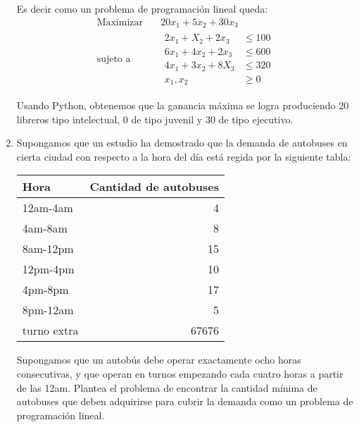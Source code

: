 \documentclass[twocolumn]{article}
\begin{document}
\begin{enumerate}
Es decir como un problema de programación lineal queda:
\begin{equation*}
 \begin{aligned}
\text{Maximizar} \quad & 20x_{1}+5x_{2}+30x_{3}\\
\text{sujeto a} \quad &
  \begin{aligned}
   2x_{1}+X_2+2x_3 &\leq 100\\
   6x_1 +4x_{2}+2x_3 &\leq 600\\
   4x_{1}+3x_{2}+8X_3 &\leq 320\\
    x_{1},x_{2} &\geq 0
  \end{aligned}
\end{aligned}
\end{equation*}

Usando Python, obtenemos que la ganancia máxima se logra produciendo 20 libreros tipo intelectual, 0 de tipo juvenil y 30 de tipo ejecutivo. 


\item Supongamos que un estudio ha demostrado que la demanda de autobuses
en cierta ciudad con respecto a la hora del día está regida por la
siguiente tabla:
\begin{center}
\begin{tabular}{lr}
Hora & Cantidad de autobuses\\
\hline
12am-4am & 4\\
4am-8am & 8\\
8am-12pm & 15\\
12pm-4pm & 10\\
4pm-8pm & 17\\
8pm-12am & 5\\
turno extra & 67676\\
\end{tabular}
\end{center}

Supongamos que un autobús debe operar exactamente ocho horas
consecutivas, y que operan en turnos empezando cada cuatro horas a
partir de las 12am. Plantea el problema de encontrar la cantidad
mínima de autobuses que deben adquirirse para cubrir la
demanda como un problema de programación lineal.
\end{enumerate}
\end{document}
